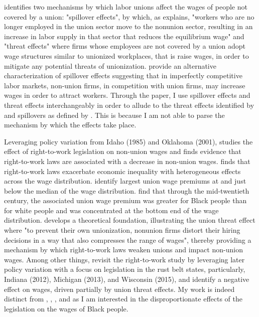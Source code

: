 \documentclass[11pt]{article}
\begin{document}
\citet{lewis1963} identifies two mechanisms by which labor unions affect the wages of people not covered by a union: "spillover effects", by which, as \citet{farber2005} explains, "workers who are no longer employed in the union sector move to the nonunion sector, resulting in an increase in labor supply in that sector that reduces the equilibrium wage" and "threat effects" where firms whose employees are not covered by a union adopt wage structures similar to unionized workplaces, that is raise wages, in order to mitigate any potential threats of unionization. \citet{fll2021} provide an alternative characterization of spillover effects suggesting that in imperfectly competitive labor markets, non-union firms, in competition with union firms, may increase wages in order to attract workers. Through the paper, I use spillover effects and threat effects interchangeably in order to allude to the threat effects identified by \citet{lewis1963} and spillovers as defined by \citet{fll2021}. This is because I am not able to parse the mechanism by which the effects take place. 

Leveraging policy variation from Idaho (1985) and Oklahoma (2001), \citet{farber2005} studies the effect of right-to-work legislation on non-union wages and finds evidence that right-to-work laws are associated with a decrease in non-union wages. \citet{vanheuvelen2020} finds that right-to-work laws exacerbate economic inequality with heterogeneous effects across the wage distribution. \citet{ffl2009} identify largest union wage premiums at and just below the median of the wage distribution. \citet{callawaycollins2018} find that through the mid-twentieth century, the associated union wage premium was greater for Black people than for white people and was concentrated at the bottom end of the wage distribution. \citet{taschereau-dumouchel2020} develops a theoretical foundation, illustrating the union threat effect where "to prevent their own unionization, nonunion firms distort their hiring decisions in a way that also compresses the range of wages", thereby providing a mechanism by which right-to-work laws weaken unions and impact non-union wages. Among other things, \citet{fll2018} revisit the right-to-work study by \citet{farber2005} leveraging later policy variation with a focus on legislation in the rust belt states, particularly, Indiana (2012), Michigan (2013), and Wisconsin (2015), and identify a negative effect on wages, driven partially by union threat effects. My work is indeed distinct from \citet{farber2005}, \citet{vanheuvelen2020}, \citet{taschereau-dumouchel2020}, and \citet{fll2018} as I am interested in the disproportionate effects of the legislation on the wages of Black people.
\end{document}
